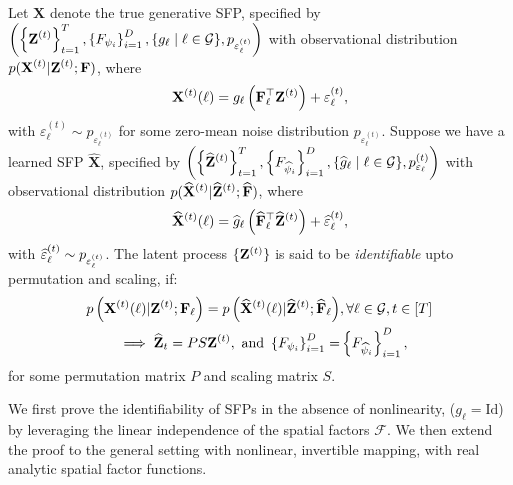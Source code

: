 \begin{definition}
  Let $\mathbf{X}$ denote the true generative SFP, specified by $\displaystyle \left(\left\{\mathbf{Z}^{(t)}\right\}_{t=1}^T, \left\{ F_{\psi_i} \right\}_{i=1}^D , \{ g_{\ell} \mid \ell \in \mathcal{G}\}, p_{\varepsilon_{\ell}^{(t)}} \right)$  with observational distribution $\displaystyle p(\mathbf{X}^{(t)} | \mathbf{Z}^{(t)}; \mathbf{F})$, where 
  \begin{equation}
      \mathbf{X}^{(t)}(\ell) = g_{\ell} \left( \mathbf{F}_{\ell}^\top \mathbf{Z}^{(t)} \right) + \varepsilon_{\ell}^{(t)}, \label{eqn:xt1_main}
  \end{equation} 
  with $\varepsilon_{\ell}^{(t)} \sim p_{\varepsilon_{\ell}^{(t)}}$ for some zero-mean noise distribution $p_{\varepsilon_{\ell}^{(t)}}$. Suppose we have a learned SFP $\displaystyle \widehat{\mathbf{X}}$, specified by $\displaystyle \left(\left\{\widehat{\mathbf{Z}}^{(t)} \right\}_{t=1}^T, \left\{ F_{\widehat{\psi}_i} \right\}_{i=1}^D, \{ \widehat{g}_{\ell} \mid \ell \in \mathcal{G}\}, {p_{{\varepsilon}_{\ell}}^{(t)}} \right)$
  with observational distribution $\displaystyle p( \widehat{\mathbf{X}}^{(t)} | \widehat{\mathbf{Z}}^{(t)}; \widehat{\mathbf{F}})$, where
  \begin{equation}
  \displaystyle \widehat{\mathbf{X}}^{(t)}(\ell) = \widehat{g}_{\ell} \left( \widehat{\mathbf{F}}_{\ell}^\top \widehat{\mathbf{Z}}^{(t)} \right) + \widehat{\varepsilon}_{\ell}^{(t)}, \label{eqn:hatxt1_main}   
  \end{equation}
  with $\widehat{\varepsilon}_{\ell}^{(t)} \sim {p_{{\varepsilon}_{\ell}^{(t)}}}$. The latent process $\{\mathbf{Z}^{(t)}\}$ is said to be \textit{identifiable} upto permutation and scaling, if:
  \begin{align*}
    p \left(\mathbf{X}^{(t)}(\ell) | \mathbf{Z}^{(t)}; \mathbf{F}_{\ell} \right) = p \left( \widehat{\mathbf{X}}^{(t)}(\ell) | \widehat{\mathbf{Z}}^{(t)}; \widehat{\mathbf{F}}_{\ell} \right)&, {\forall \ell \in \mathcal{G}, t \in [T]} \\
    \implies \widehat{\mathbf{Z}}_t = PS \mathbf{Z}^{(t)}, \text{ and } \left\{ F_{\psi_i}\right\}_{i=1}^D = &\left\{ F_{\widehat{\psi}_i}\right\}_{i=1}^D,
  \end{align*}
  for some permutation matrix $P$ and scaling matrix $S$.
\end{definition}

We first prove the identifiability of SFPs in the absence of nonlinearity, ($g_\ell = \text{Id}$) by leveraging the linear independence of the spatial factors $\mathcal{F}$. We then extend the proof to the general setting with nonlinear, invertible mapping, with real analytic spatial factor functions.

\setcounter{theorem}{0}

